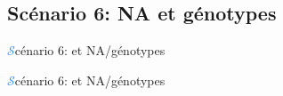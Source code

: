 \subsection{Scénario 6: NA et génotypes}
\begin{frame}{{\huge\textcolor{dodgerblue}{$\mathcal{S}$}}cénario 6:  et NA/génotypes}
\begin{center}
\end{center}
\end{frame}
\begin{frame}{{\huge\textcolor{dodgerblue}{$\mathcal{S}$}}cénario 6:  et NA/génotypes}
\begin{center}
\end{center}
\end{frame}

